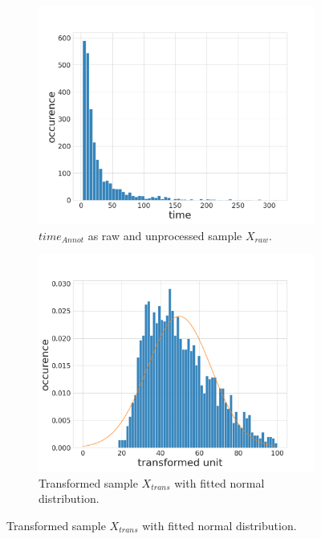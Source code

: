 \begin{figure} [h]
	\centering
	\begin{subfigure}[t]{0.3\textwidth}
		\centering
		\includegraphics[width=\textwidth]{figures/chap51_time_raw.png}
		\caption{
			$ time_{Annot} $ as raw and unprocessed sample $ X_{raw} $.
		}\label{fig:ch5:sec1:time_raw}
	\end{subfigure}
	\hfill
	\begin{subfigure}[t]{0.3\textwidth}
		\centering
		\includegraphics[width=\textwidth]{figures/chap51_time_trans.png}
		\caption{
			Transformed sample $X_{trans}$ with fitted normal distribution.
		} \label{fig:ch5:sec1:time_transformed}

\end{subfigure}
\end{figure}
